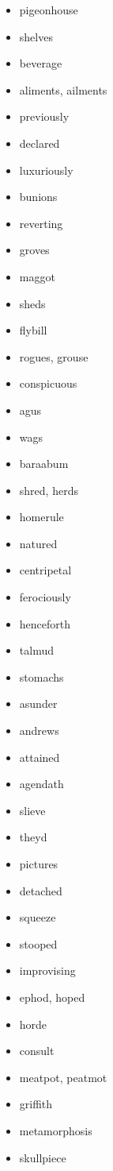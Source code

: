 \documentclass{article}
\begin{document}
\begin{itemize}
    \item pigeonhouse
    \item shelves
    \item beverage
    \item aliments, ailments
    \item previously
    \item declared
    \item luxuriously
    \item bunions
    \item reverting
    \item groves
    \item maggot
    \item sheds
    \item flybill
    \item rogues, grouse
    \item conspicuous
    \item agus
    \item wags
    \item baraabum
    \item shred, herds
    \item homerule
    \item natured
    \item centripetal
    \item ferociously
    \item henceforth
    \item talmud
    \item stomachs
    \item asunder
    \item andrews
    \item attained
    \item agendath
    \item slieve
    \item theyd
    \item pictures
    \item detached
    \item squeeze
    \item stooped
    \item improvising
    \item ephod, hoped
    \item horde
    \item consult
    \item meatpot, peatmot
    \item griffith
    \item metamorphosis
    \item skullpiece

\end{itemize}
\end{document}
